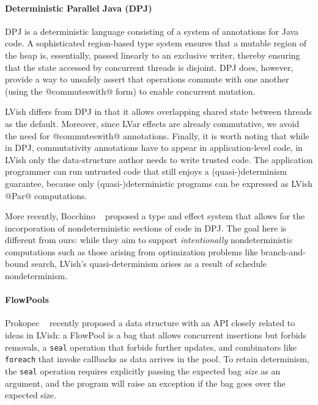 \paragraph{Deterministic Parallel Java (DPJ)}

DPJ \cite{dpj-oopsla, dpj-hotpar09} is a deterministic language
consisting of a system of annotations for Java code.  A sophisticated
region-based type system ensures that a mutable region of the heap is,
essentially, passed linearly to an exclusive writer, thereby ensuring
that the state accessed by concurrent threads is disjoint.  DPJ does,
however, provide a way to unsafely assert that operations commute with
one another (using the @commuteswith@ form) to enable concurrent
mutation.

LVish differs from DPJ in that it allows overlapping shared state
between threads as the default.  Moreover, since LVar effects are
already commutative, we avoid the need for @commuteswith@ annotations.
Finally, it is worth noting that while in DPJ, commutativity
annotations have to appear in application-level code, in LVish only
the data-structure author needs to write trusted code. The application
programmer can run untrusted code that still enjoys a (quasi-)determinism guarantee, because only (quasi-)deterministic programs can be expressed as LVish @Par@
computations.

More recently, Bocchino \etal~\cite{dpj-popl} proposed a type and effect system that
allows for the incorporation of nondeterministic
sections of code in DPJ.  The goal here is different from ours: while they
aim to support \emph{intentionally} nondeterministic computations such
as those arising from optimization problems like branch-and-bound
search, LVish's quasi-determinism arises as a result of schedule
nondeterminism.

\paragraph{FlowPools}

Prokopec \etal~\cite{flowpools} recently proposed a data structure with
an API closely related to ideas in LVish: a FlowPool is a bag that allows
concurrent insertions but forbids removals, a {\tt seal} operation that forbids
further updates, and combinators like {\tt foreach} that invoke callbacks as
data arrives in the pool.  To retain determinism, the {\tt seal} operation
requires explicitly passing the expected bag \emph{size} as an argument, and the
program will raise an exception if the bag goes over the expected size.

